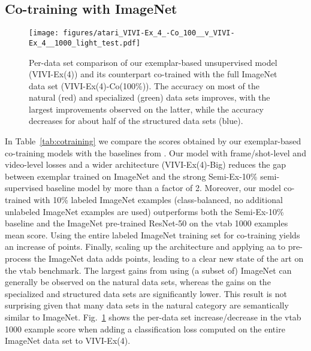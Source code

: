 \documentclass[10pt,twocolumn,letterpaper]{article}
\begin{document}
{\subsection{Co-training with ImageNet}
\begin{figure}[t!]
\vspace{-0.2cm}
\centering
\texttt{[image: figures/atari\_VIVI-Ex\_4\_-Co\_100\_\_v\_VIVI-Ex\_4\_\_1000\_light\_test.pdf]}
\vspace{-0.3cm}
\caption{Per-data set comparison of our exemplar-based unsupervised model (VIVI-Ex(4)) and its counterpart co-trained with the full ImageNet data set (VIVI-Ex(4)-Co(100\%)). The accuracy on most of the natural (red) and specialized (green) data sets improves, with the largest improvements observed on the latter, while the accuracy decreases for about half of the structured data sets (blue).}
\label{fig:atari1}
\vspace{-0.1cm}
\end{figure}
In Table~\ref{tab:cotraining} we compare the scores obtained by our exemplar-based co-training models with the baselines from \cite{zhai2019visual}. Our model with frame/shot-level and video-level losses and a wider architecture (VIVI-Ex(4)-Big) reduces the gap between exemplar trained on ImageNet and the strong Semi-Ex-10\% semi-supervised baseline model by more than a factor of 2. Moreover, our model co-trained with 10\% labeled ImageNet examples (class-balanced, no additional unlabeled ImageNet examples are used) outperforms both the Semi-Ex-10\% baseline and the ImageNet pre-trained ResNet-50 on the \gls{vtab} 1000 examples mean score. Using the entire labeled ImageNet training set for co-training yields an increase of  points. Finally, scaling up the architecture and applying \gls{aa} to pre-process the ImageNet data adds  points, leading to a clear new state of the art on the \gls{vtab} benchmark. The largest gains from using (a subset of) ImageNet can generally be observed on the natural data sets, whereas the gains on the specialized and structured data sets are significantly lower. This result is not surprising given that many data sets in the natural category are semantically similar to ImageNet. Fig.~\ref{fig:atari1} shows the per-data set increase/decrease in the \gls{vtab} 1000 example score when adding a classification loss computed on the entire ImageNet data set to VIVI-Ex(4).

\vspace{1mm}
}
\end{document}
